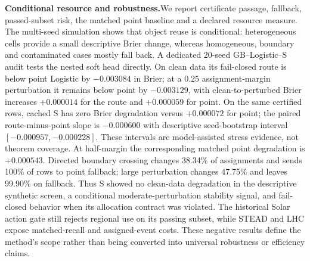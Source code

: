 \documentclass[10pt]{article}
\begin{document}
\textbf{Conditional resource and robustness.}\;We report certificate passage, fallback, passed-subset risk, the matched point baseline and a declared resource measure. The multi-seed simulation shows that object reuse is conditional: heterogeneous cells provide a small descriptive Brier change, whereas homogeneous, boundary and contaminated cases mostly fall back. A dedicated 20-seed GB--Logistic--S audit tests the nested soft head directly. On clean data its fail-closed route is below point Logistic by $-0.003084$ in Brier; at a $0.25$ assignment-margin perturbation it remains below point by $-0.003129$, with clean-to-perturbed Brier increases $+0.000014$ for the route and $+0.000059$ for point. On the same certified rows, cached S has zero Brier degradation versus $+0.000072$ for point; the paired route-minus-point slope is $-0.000600$ with descriptive seed-bootstrap interval $[-0.000957,-0.000228]$. These intervals are model-assisted stress evidence, not theorem coverage. At half-margin the corresponding matched point degradation is $+0.000543$. Directed boundary crossing changes 38.34\% of assignments and sends 100\% of rows to point fallback; large perturbation changes 47.75\% and leaves 99.90\% on fallback. Thus S showed no clean-data degradation in the descriptive synthetic screen, a conditional moderate-perturbation stability signal, and fail-closed behavior when its allocation contract was violated. The historical Solar action gate still rejects regional use on its passing subset, while STEAD and LHC expose matched-recall and assigned-event costs. These negative results define the method's scope rather than being converted into universal robustness or efficiency claims.
\end{document}
